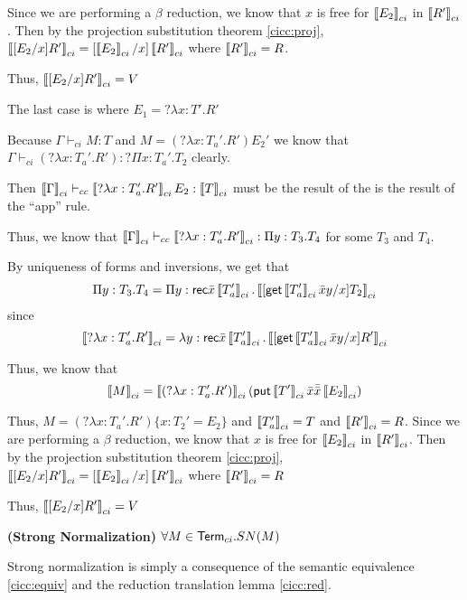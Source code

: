 Since we are performing a $\beta$ reduction, we know that $x$ is free for $\left\llbracket E_2 \right\rrbracket_{ci}$ in 
$\left\llbracket R' \right\rrbracket_{ci}$.  Then by the projection substitution theorem \ref{cicc:proj}, 
$\left\llbracket [E_2/x]R' \right\rrbracket_{ci} = [ \left\llbracket E_2 \right\rrbracket_{ci} / x ] \left\llbracket R' \right\rrbracket_{ci} $ where $\left\llbracket R' \right\rrbracket_{ci} = R$.

Thus, $\left\llbracket [E_2 / x] R' \right\rrbracket_{ci} = V$

\begin{tcases}
The last case is where $E_1 = ?\lambda x : T' . R'$
\end{tcases}

Because $\Gamma \vdash_{ci} M : T$ and $M = (?\lambda x : T_a' . R') E_2'$
we know that $\Gamma \vdash_{ci} (?\lambda x : T_a' . R') : ?\Pi x : T_a' . T_2$ clearly.  

Then $\left\llbracket \Gamma \right\rrbracket_{ci} \vdash_{cc} \left\llbracket ?\lambda x : T_a' . R' \right\rrbracket_{ci} E_2 : \left\llbracket T \right\rrbracket_{ci}$
 must be the result of the is the result of the ``app'' rule. 

Thus, we know that $\left\llbracket \Gamma \right\rrbracket_{ci} \vdash_{cc} \left\llbracket ?\lambda x : T_a' . R' \right\rrbracket_{ci} : \Pi y : T_3 . T_4$ for some $T_3$ and $T_4$.

By uniqueness of forms and inversions, we get that 
\[
\Pi y : T_3 . T_4 
= \Pi y : \mathsf{rec} \bar{x}\left\llbracket T_a' \right\rrbracket_{ci} . \left\llbracket [ \mathsf{get} \left\llbracket T_a' \right\rrbracket_{ci} \bar{x} y / x ] T_2 \right\rrbracket_{ci}
\]
since 
\[
\left\llbracket ?\lambda x : T_a' . R' \right\rrbracket_{ci} 
= 
\lambda y : \mathsf{rec} \bar{x}\left\llbracket T_a' \right\rrbracket_{ci} . \left\llbracket [ \mathsf{get} \left\llbracket T_a' \right\rrbracket_{ci} \bar{x} y / x ] R' \right\rrbracket_{ci}
\]

Thus, we know that 
\[
\left\llbracket M \right\rrbracket_{ci} = 
\left\llbracket (?\lambda x : T_a' . R') \right\rrbracket_{ci} (\mathsf{put} \left\llbracket T' \right\rrbracket_{ci}\bar{x}\bar{\bar{x}} \left\llbracket E_2 \right\rrbracket_{ci})
\]

Thus, $M = (?\lambda x : T_a' . R')\{ x : T_2' = E_2\} $ and $\left\llbracket T_a' \right\rrbracket_{ci} = T$ 
and $\left\llbracket R' \right\rrbracket_{ci} = R$.  Since we are performing a $\beta$ reduction, we know that
$x$ is free for $\left\llbracket E_2 \right\rrbracket_{ci}$ in $\left\llbracket R' \right\rrbracket_{ci}$.  
Then by the projection substitution theorem \ref{cicc:proj}, 
$\left\llbracket [E_2/x]R' \right\rrbracket_{ci} = [ \left\llbracket E_2 \right\rrbracket_{ci}/x ] \left\llbracket R' \right\rrbracket_{ci}$
where $\left\llbracket R' \right\rrbracket_{ci} = R$

Thus, $\left\llbracket [E_2/x] R' \right\rrbracket_{ci} = V$



\begin{theorem}
\textbf{(Strong Normalization)} $\forall M \in \mathsf{Term}_{ci}. SN(M)$
\label{ci:sn}
\end{theorem}

Strong normalization is simply a consequence of the semantic equivalence \ref{cicc:equiv} and the 
reduction translation lemma \ref{cicc:red}.

